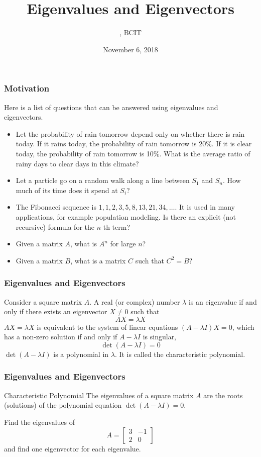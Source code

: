 \documentclass[xcolor=dvipsnames]{beamer}
\title{Eigenvalues and Eigenvectors}
\subtitle{{\CourseNumber}, BCIT}
\author{\CourseName}
\date{November 6, 2018}
\begin{document}
\begin{frame}
  \titlepage
\end{frame}

\begin{frame}
  \frametitle{Motivation}
Here is a list of questions that can be answered using eigenvalues and
eigenvectors.
\begin{itemize}
\item Let the probability of rain tomorrow depend only on whether
  there is rain today. If it rains today, the probability of rain
  tomorrow is 20\%. If it is clear today, the probability of rain
  tomorrow is 10\%. What is the average ratio of rainy days to clear
  days in this climate?
\item Let a particle go on a random walk along a line between $S_{1}$
  and $S_{n}$. How much of its time does it spend at $S_{i}$?
\item The Fibonacci sequence is $1,1,2,3,5,8,13,21,34,{\ldots}$. It is
  used in many applications, for example population modeling. Is there
  an explicit (not recursive) formula for the $n$-th term?
\item Given a matrix $A$, what is $A^{n}$ for large $n$?
\item Given a matrix $B$, what is a matrix $C$ such that $C^{2}=B$?
\end{itemize}
\end{frame}

\begin{frame}
  \frametitle{Eigenvalues and Eigenvectors}
  Consider a square matrix $A$. A real (or complex) number $\lambda$
  is an \alert{eigenvalue} if and only if there exists an \alert{eigenvector}
  $X\neq{}0$ such that
  \begin{equation}
    \label{eq:raeshaez}
    AX=\lambda{}X
  \end{equation}
  $AX=\lambda{}X$ is equivalent to the system of linear equations
  $(A-\lambda{}I)X=0$, which has a non-zero solution if and only if
  $A-\lambda{}I$ is singular,
\begin{equation}
  \label{eq:aeshopae}
  \det(A-\lambda{}I)=0
\end{equation}
$\det(A-\lambda{}I)$ is a polynomial in $\lambda$. It is called the
\alert{characteristic polynomial}.
\end{frame}

\begin{frame}
  \frametitle{Eigenvalues and Eigenvectors}
  \begin{block}{Characteristic Polynomial}
    The eigenvalues of a square matrix $A$ are the roots (solutions)
    of the polynomial equation $\det(A-\lambda{}I)=0$.
  \end{block}

  \bigskip

  {\ubung} Find the eigenvalues of
  \begin{equation}
    \label{eq:neevicuo}
    A=\left[
      \begin{array}{cc}
        3&-1\\
        2&0
      \end{array}\right]
  \end{equation}
and find one eigenvector for each eigenvalue.
\end{frame}
\end{document}
